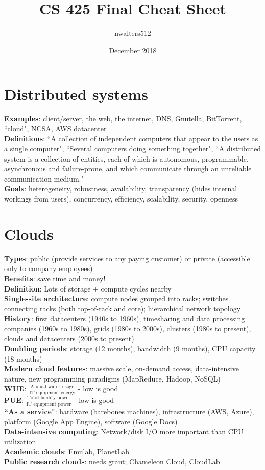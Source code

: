 \documentclass{article}
\title{CS 425 Final Cheat Sheet}
\author{nwalters512 }
\date{December 2018}
\begin{document}
\fontsize{7}{7}
\selectfont
\begin{multicols*}{3}
\section{Distributed systems}
\textbf{Examples}: client/server, the web, the internet, DNS, Gnutella, BitTorrent, ``cloud", NCSA, AWS datacenter \\
\textbf{Definitions}: ``A collection of independent computers that appear to the users as a single computer", ``Several computers doing something together", ``A distributed system is a collection of entities, each of which is autonomous, programmable, asynchronous and failure-prone, and which communicate through an unreliable communication medium." \\
\textbf{Goals}: heterogeneity, robustness, availability, transparency (hides internal workings from users), concurrency, efficiency, scalability, security, openness

\section{Clouds}
\textbf{Types}: public (provide services to any paying customer) or private (accessible only to company employees) \\
\textbf{Benefits}: save time and money! \\
\textbf{Definition}: Lots of storage + compute cycles nearby \\
\textbf{Single-site architecture}: compute nodes grouped into racks; switches connecting racks (both top-of-rack and core); hierarchical network topology \\
\textbf{History}: first datacenters (1940s to 1960s), timesharing and data processing companies (1960s to 1980s), grids (1980s to 2000s), clusters (1980s to present), clouds and datacenters (2000s to present) \\
\textbf{Doubling periods}: storage (12 months), bandwidth (9 months), CPU capacity (18 months) \\
\textbf{Modern cloud features}: massive scale, on-demand access, data-intensive nature, new programming paradigms (MapReduce, Hadoop, NoSQL) \\
\textbf{WUE}: $\frac{\text{Annual water usage}}{\text{IT equipment energy}}$ - low is good \\
\textbf{PUE}: $\frac{\text{Total facility power}}{\text{IT equipment power}}$ - low is good \\
\textbf{``As a service"}: hardware (barebones machines), infrastructure (AWS, Azure), platform (Google App Engine), software (Google Docs) \\
\textbf{Data-intensive computing}: Network/disk I/O more important than CPU utilization \\
\textbf{Academic clouds}: Emulab, PlanetLab \\
\textbf{Public research clouds}: needs grant; Chameleon Cloud, CloudLab


\end{multicols*}
\end{document}
